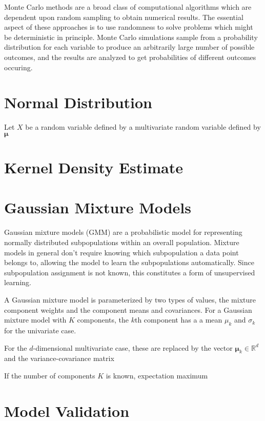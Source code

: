 Monte Carlo methods are a broad class of computational algorithms which are dependent upon random sampling to obtain numerical results.
The essential aspect of these approaches is to use randomness to solve problems which might be deterministic in principle.
Monte Carlo simulations sample from a probability distribution for each variable to produce an arbitrarily large number of possible outcomes, and  the results are analyzed to get probabilities of different outcomes occuring.

\section{Normal Distribution}

Let $X$ be a random variable defined by a multivariate random variable defined by $\bm{\mu}$

\section{Kernel Density Estimate}

\section{Gaussian Mixture Models}

Gaussian mixture models (GMM) are a probabilistic model for representing normally distributed subpopulations within an overall population. Mixture models in general don't require knowing which subpopulation a data point belongs to, allowing the model to learn the subpopulations automatically. Since subpopulation assignment is not known, this constitutes a form of unsupervised learning.

A Gaussian mixture model is parameterized by two types of values, the mixture component weights and the component means and covariances.  For a Gaussian mixture model with $K$ components, the $k$th component has a a mean $\mu_k$ and $\sigma_k$ for the univariate case.

For the $d$-dimensional multivariate case, these are replaced by the vector $\bm{\mu}_k \in \mathbb{R}^d$ and the variance-covariance matrix

If the number of components $K$ is known, expectation maximum

\section{Model Validation}

